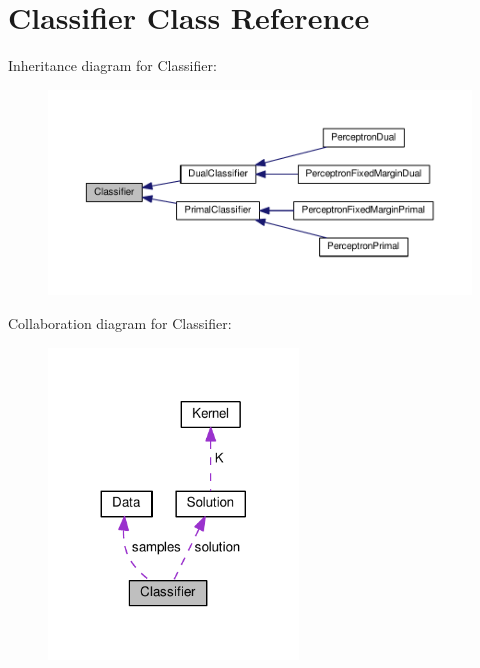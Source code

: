 \hypertarget{class_classifier}{}\section{Classifier Class Reference}
\label{class_classifier}


Inheritance diagram for Classifier\+:\nopagebreak
\begin{figure}[H]
\begin{center}
\leavevmode
\includegraphics[width=350pt]{class_classifier__inherit__graph}
\end{center}
\end{figure}


Collaboration diagram for Classifier\+:\nopagebreak
\begin{figure}[H]
\begin{center}
\leavevmode
\includegraphics[width=188pt]{class_classifier__coll__graph}
\end{center}
\end{figure}
